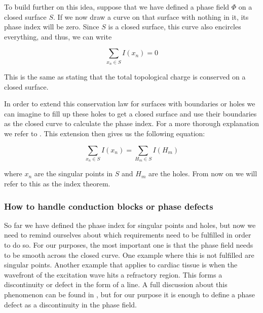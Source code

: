 \documentclass[twocolumn]{article}
\begin{document}
\noindent To build further on this idea, suppose that we have defined a phase
field \(\Phi\) on a closed surface \(S\). If we now draw a curve on that
surface with nothing in it, its phase index will be zero. Since \(S\) is
a closed surface, this curve also encircles everything, and thus, we can
write

\begin{equation}
  \sum_{x_n \in S} I(x_n) = 0
  \label{eq:index-theorem}
\end{equation}

\noindent This is the same as stating that the total topological charge is
conserved on a closed surface.

In order to extend this conservation law for surfaces with boundaries or
holes we can imagine to fill up these holes to get a closed surface and
use their boundaries as the closed curve to calculate the phase index.
For a more thorough explanation we refer to
\autocite{herlin2012reconstruction, davidsen2004topological}. This
extension then gives us the following equation:

\begin{equation}
  \sum_{x_n \in S} I(x_n) = \sum_{H_m \in S} I(H_m)
  \label{eq:index-theorem-extended}
\end{equation}

\noindent where \(x_n\) are the singular points in \(S\) and \(H_m\) are the
holes. From now on we will refer to this as the index theorem.

\subsubsection{How to handle conduction blocks or phase
defects}\label{how-to-handle-conduction-blocks-or-phase-defects}

So far we have defined the phase index for singular points and holes,
but now we need to remind ourselves about which requirements need to be
fulfilled in order to do so. For our purposes, the most important one is
that the phase field needs to be smooth across the closed curve. One
example where this is not fulfilled are singular points. Another example
that applies to cardiac tissue is when the wavefront of the excitation
wave hits a refractory region. This forms a discontinuity or defect in
the form of a line. A full discussion about this phenomenon can be found
in \autocite{tomii2021spatial}, but for our purpose it is enough to define a
phase defect as a discontinuity in the phase field.
\end{document}
